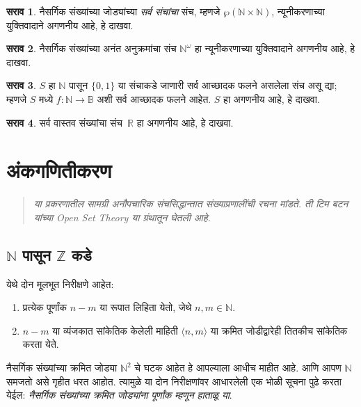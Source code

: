 \documentclass[11pt,a4paper,openany]{book}
\theoremstyle{definition}
\newtheorem{prob}{सराव}[chapter]
\newcommand{\Pow}[1]{\wp(#1)}
\newcommand{\tuple}[1]{\langle #1\rangle}
\newcommand{\Nat}{\mathbb{N}}
\newcommand{\Int}{\mathbb{Z}}
\newcommand{\Real}{\mathbb{R}}
\newcommand{\Bin}{\mathbb{B}}
\newenvironment{editorial}{\begin{quote}\small\itshape}{\end{quote}}
\begin{document}
\begin{prob}
नैसर्गिक संख्यांच्या जोड्यांच्या \emph{सर्व संचांचा} संच, म्हणजे
$\Pow{\Nat \times \Nat}$, न्यूनीकरणाच्या युक्तिवादाने
अगणनीय आहे, हे दाखवा.
\end{prob}

\begin{prob}
नैसर्गिक संख्यांच्या अनंत अनुक्रमांचा संच $\Nat^\omega$ हा
न्यूनीकरणाच्या युक्तिवादाने अगणनीय आहे, हे दाखवा.
\end{prob}


\begin{prob}
$S$ हा $\Nat$ पासून $\{0,1\}$ या संचाकडे जाणारी सर्व
आच्छादक फलने असलेला संच असू द्या; म्हणजे $S$ मध्ये
$f \colon \Nat \to \Bin$ अशी सर्व आच्छादक फलने आहेत. $S$ हा
अगणनीय आहे, हे दाखवा.
\end{prob}

\begin{prob}
सर्व वास्तव संख्यांचा संच~$\Real$ हा अगणनीय आहे, हे दाखवा.
\end{prob}



\chapter{अंकगणितीकरण}\label{sfr:arith::chap}
\begin{editorial}
या प्रकरणातील सामग्री अनौपचारिक संचसिद्धान्तात संख्याप्रणालींची रचना
मांडते. ती टिम बटन यांच्या Open Set Theory या ग्रंथातून घेतली आहे.
\end{editorial}






\section{$\Nat$ पासून $\Int$ कडे}\label{sfr:arith:int:sec}

येथे दोन मूलभूत निरीक्षणे आहेत:
	\begin{enumerate}
		\item प्रत्येक पूर्णांक $n - m$ या रूपात लिहिता येतो, जेथे $n, m \in\Nat$.
		\item $n - m$ या व्यंजकात सांकेतिक केलेली माहिती $\tuple{n, m}$ या क्रमित जोडीद्वारेही तितकीच सांकेतिक करता येते.
	\end{enumerate}
नैसर्गिक संख्यांच्या क्रमित जोड्या $\Nat^2$ चे घटक आहेत हे आपल्याला आधीच माहीत आहे. आणि आपण $\Nat$ समजतो असे गृहीत धरत आहोत. त्यामुळे या दोन निरीक्षणांवर आधारलेली एक भोळी सूचना पुढे करता येईल: \emph{नैसर्गिक संख्यांच्या क्रमित जोड्यांना पूर्णांक म्हणून हाताळू या}.
\end{document}
